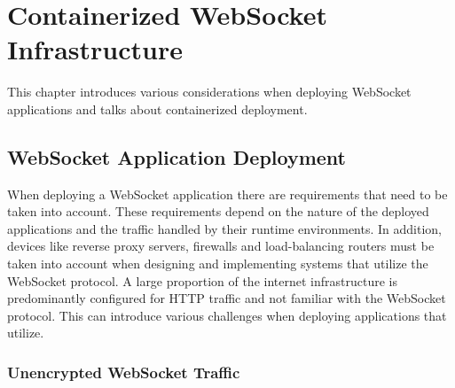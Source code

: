 \chapter{Containerized WebSocket Infrastructure}
\label{chapter:containerizedWebSocketInfrastructure}

This chapter introduces various considerations when deploying WebSocket applications and talks about containerized deployment.

\section{WebSocket Application Deployment}

When deploying a WebSocket application there are requirements that need to be taken into account. These requirements depend on the nature of the deployed applications and the traffic handled by their runtime environments. In addition, devices like reverse proxy servers, firewalls and load-balancing routers must be taken into account when designing and implementing systems that utilize the WebSocket protocol. A large proportion of the internet infrastructure is predominantly configured for HTTP traffic and not familiar with the WebSocket protocol. This can introduce various challenges when deploying applications that utilize.

\subsection{Unencrypted WebSocket Traffic}

